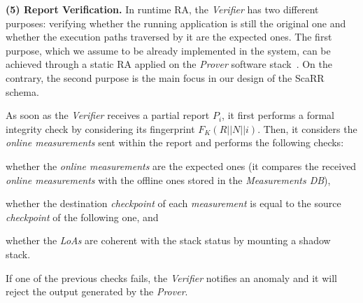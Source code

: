 


\textbf{(5) Report Verification.}  
In runtime RA, the \emph{Verifier} has two different purposes: verifying 
whether the running application is still the original one and whether the 
execution paths traversed by it are the expected ones.
The first purpose, which we assume to be already implemented in the 
system, can be achieved through a static RA applied on the \emph{Prover} 
software stack~\citep{costan2016intel,winter2008trusted}. 
On the contrary, the second purpose is the main focus in our design of the 
ScaRR schema. 

As soon as the \emph{Verifier} receives a partial report $P_i$, it first 
performs a formal integrity check by considering its fingerprint 
$F_K(R||N||i)$. Then, it considers the \emph{online measurements} sent within 
the report and performs the following checks: 
\begin{enumerate*}[label=(C\arabic*)]
	\item whether the \emph{online measurements} are the expected ones (\ie it 
	compares the received \emph{online measurements} with the offline ones 
	stored in the \emph{Measurements DB}),
	\item whether the destination \emph{checkpoint} of each \emph{measurement} 
	is equal to the source \emph{checkpoint} of the following one, and
	\item whether the \emph{LoAs} are coherent with the stack status by 
	mounting a shadow stack.
\end{enumerate*}
If one of the previous checks fails, the \emph{Verifier} notifies an anomaly 
and it will reject the output generated by the \emph{Prover}.

